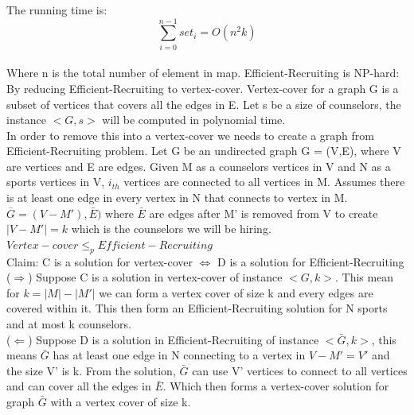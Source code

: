 \documentclass[a4paper, 11pt]{article}
\begin{document}
The running time is:
$$\sum_{i=0}^{n-1} set_{i} = O(n^{2}k)$$\\
Where n is the total number of element in map.
Efficient-Recruiting is NP-hard:\\
By reducing Efficient-Recruiting to vertex-cover. Vertex-cover for a graph G is a subset of vertices that covers all the edges in E. Let s be a size of counselors, the instance $<G,s>$ will be computed in polynomial time.\\
In order to remove this into a vertex-cover we needs to create a graph from Efficient-Recruiting problem. Let G be an undirected graph G = (V,E), where V are vertices and E are edges. Given M as a counselors vertices in V and N as a sports vertices in V, $i_{th}$ vertices are connected to all vertices in M. Assumes there is at least one edge in every vertex in N that connects to vertex in M. $\bar{G} = (V-M'), \bar{E})$ where $\bar{E}$ are edges after M' is removed from V to create $|V-M'| = k$ which is the counselors we will be hiring.\\
$Vertex-cover \leq_{p} Efficient-Recruiting$\\
Claim: C is a solution for vertex-cover $\iff$ D is a solution for Efficient-Recruiting\\
($\Rightarrow$) Suppose C is a solution in vertex-cover of instance $<G,k>$. This mean for $k = |M| - |M'|$ we can form a vertex cover of size k and every edges are covered within it. This then form an Efficient-Recruiting solution for N sports and at most k counselors.\\
($\Leftarrow$) Suppose D is a solution in Efficient-Recruiting of instance $<\bar{G},k>$, this means $\bar{G}$ has at least one edge in N connecting to a vertex in $V-M'=V'$ and the size V' is k. From the solution, $\bar{G}$ can use V' vertices to connect to all vertices and can cover all the edges in $\bar{E}$. Which then forms a vertex-cover solution for graph $\bar{G}$ with a vertex cover of size k.
\end{document}
